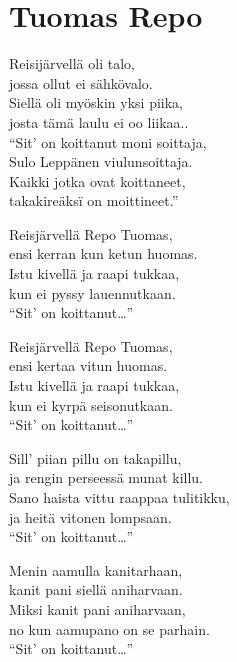 \section{Tuomas Repo}
Reisijärvellä oli talo,\\
jossa ollut ei sähkövalo.\\
Siellä oli myöskin yksi piika,\\
josta tämä laulu ei oo liikaa..\\
“Sit' on koittanut moni soittaja,\\
Sulo Leppänen viulunsoittaja.\\
Kaikki jotka ovat koittaneet,\\
takakireäksï on moittineet.”

Reisjärvellä Repo Tuomas,\\
ensi kerran kun ketun huomas.\\
Istu kivellä ja raapi tukkaa,\\
kun ei pyssy lauennutkaan.\\
“Sit' on koittanut…”

Reisjärvellä Repo Tuomas,\\
ensi kertaa vitun huomas.\\
Istu kivellä ja raapi tukkaa,\\
kun ei kyrpä seisonutkaan.\\
“Sit' on koittanut…”

Sill' piian pillu on takapillu,\\
ja rengin perseessä munat killu.\\
Sano haista vittu raappaa tulitikku,\\
ja heitä vitonen lompsaan.\\
“Sit' on koittanut…”

Menin aamulla kanitarhaan,\\
kanit pani siellä aniharvaan.\\
Miksi kanit pani aniharvaan,\\
no kun aamupano on se parhain.\\
“Sit' on koittanut…”